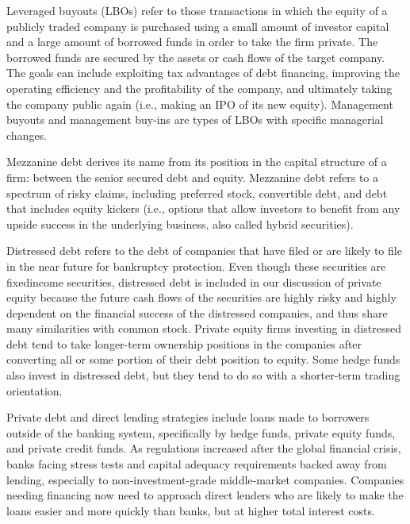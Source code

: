 \documentclass[11pt]{article}
\begin{document}
Leveraged buyouts (LBOs) refer to those transactions in which the equity of a publicly traded company is purchased using a small amount of investor capital and a large amount of borrowed funds in order to take the firm private. The borrowed funds are secured by the assets or cash flows of the target company. The goals can include exploiting tax advantages of debt financing, improving the operating efficiency and the profitability of the company, and ultimately taking the company public again (i.e., making an IPO of its new equity). Management buyouts and management buy-ins are types of LBOs with specific managerial changes.

Mezzanine debt derives its name from its position in the capital structure of a firm: between the senior secured debt and equity. Mezzanine debt refers to a spectrum of risky claims, including preferred stock, convertible debt, and debt that includes equity kickers (i.e., options that allow investors to benefit from any upside success in the underlying business, also called hybrid securities).

Distressed debt refers to the debt of companies that have filed or are likely to file in the near future for bankruptcy protection. Even though these securities are fixedincome securities, distressed debt is included in our discussion of private equity because the future cash flows of the securities are highly risky and highly dependent on the financial success of the distressed companies, and thus share many similarities with common stock. Private equity firms investing in distressed debt tend to take longer-term ownership positions in the companies after converting all or some portion of their debt position to equity. Some hedge funds also invest in distressed debt, but they tend to do so with a shorter-term trading orientation.

Private debt and direct lending strategies include loans made to borrowers outside of the banking system, specifically by hedge funds, private equity funds, and private credit funds. As regulations increased after the global financial crisis, banks facing stress tests and capital adequacy requirements backed away from lending, especially to non-investment-grade middle-market companies. Companies needing financing now need to approach direct lenders who are likely to make the loans easier and more quickly than banks, but at higher total interest costs.
\end{document}
